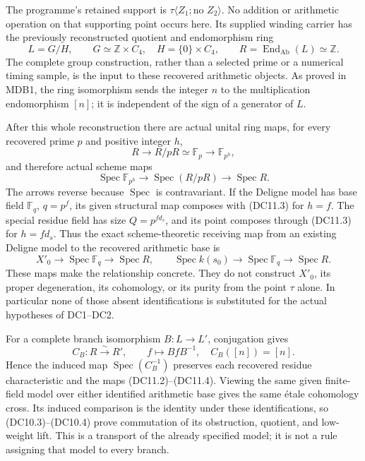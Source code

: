 \documentclass[
]{report}
\newcounter{none} %
\begin{document}
The programme's retained support is
\(\tau\langle Z_1;\text{no }Z_2\rangle\). No addition or arithmetic
operation on that supporting point occurs here. Its supplied winding
carrier has the previously reconstructed quotient and endomorphism ring
\[
L=G/H,\qquad G\simeq\mathbb Z\times C_4,\quad H=\{0\}\times C_4,
\qquad R=\operatorname{End}_{\mathrm{Ab}}(L)\simeq\mathbb Z.
\tag{DC11.1}
\] The complete group construction, rather than a selected prime or a
numerical timing sample, is the input to these recovered arithmetic
objects. As proved in MDB1, the ring isomorphism sends the integer \(n\)
to the multiplication endomorphism \([n]\); it is independent of the
sign of a generator of \(L\).

After this whole reconstruction there are actual unital ring maps, for
every recovered prime \(p\) and positive integer \(h\), \[
R\longrightarrow R/pR\simeq\mathbb F_p
 \longrightarrow\mathbb F_{p^h},
\tag{DC11.2}
\] and therefore actual scheme maps \[
\operatorname{Spec}\mathbb F_{p^h}
 \longrightarrow\operatorname{Spec}(R/pR)
 \longrightarrow\operatorname{Spec}R.
\tag{DC11.3}
\] The arrows reverse because \(\operatorname{Spec}\) is contravariant.
If the Deligne model has base field \(\mathbb F_q\), \(q=p^f\), its
given structural map composes with (DC11.3) for \(h=f\). The special
residue field has size \(Q=p^{fd_s}\), and its point composes through
(DC11.3) for \(h=fd_s\). Thus the exact scheme-theoretic receiving map
from an existing Deligne model to the recovered arithmetic base is \[
X'_0\longrightarrow\operatorname{Spec}\mathbb F_q
 \longrightarrow\operatorname{Spec}R,
\qquad
\operatorname{Spec}k(s_0)\longrightarrow\operatorname{Spec}\mathbb F_q
 \longrightarrow\operatorname{Spec}R.
\tag{DC11.4}
\] These maps make the relationship concrete. They do not construct
\(X'_0\), its proper degeneration, its cohomology, or its purity from
the point \(\tau\) alone. In particular none of those absent
identifications is substituted for the actual hypotheses of DC1--DC2.

For a complete branch isomorphism \(B:L\to L'\), conjugation gives \[
C_B:R\xrightarrow{\sim}R',\qquad f\longmapsto BfB^{-1},
\quad C_B([n])=[n].
\tag{DC11.5}
\] Hence the induced map \(\operatorname{Spec}(C_B^{-1})\) preserves
each recovered residue characteristic and the maps (DC11.2)--(DC11.4).
Viewing the same given finite-field model over either identified
arithmetic base gives the same étale cohomology cross. Its induced
comparison is the identity under these identifications, so
(DC10.3)--(DC10.4) prove commutation of its obstruction, quotient, and
low-weight lift. This is a transport of the already specified model; it
is not a rule assigning that model to every branch.
\end{document}
